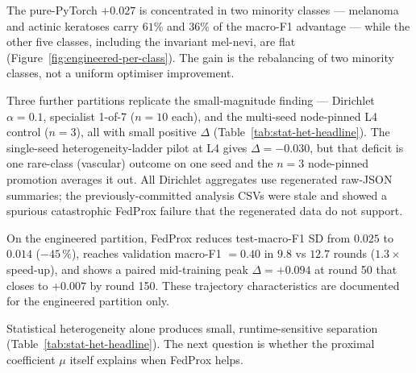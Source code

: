 \documentclass[11pt,a4paper]{report}
\begin{document}
The pure-PyTorch $+0.027$ is concentrated in two minority classes --- melanoma
and actinic keratoses carry $61\%$ and $36\%$ of the macro-F1 advantage --- while
the other five classes, including the invariant mel-nevi, are flat
(Figure~\ref{fig:engineered-per-class}). The gain is the rebalancing of two
minority classes, not a uniform optimiser improvement.

Three further partitions replicate the small-magnitude finding --- Dirichlet
$\alpha = 0.1$, specialist 1-of-7 ($n=10$ each), and the multi-seed node-pinned L4
control ($n=3$), all with small positive $\Delta$
(Table~\ref{tab:stat-het-headline}). The single-seed
heterogeneity-ladder pilot at L4 gives $\Delta = -0.030$, but that deficit is one
rare-class (vascular) outcome on one seed and the $n=3$ node-pinned promotion
averages it out. All Dirichlet aggregates use regenerated raw-JSON summaries; the
previously-committed analysis CSVs were stale and showed a spurious catastrophic
FedProx failure that the regenerated data do not support.

On the engineered partition, FedProx reduces test-macro-F1 SD from $0.025$
to $0.014$ ($-45\,\%$), reaches validation macro-F1 $= 0.40$ in $9.8$ vs
$12.7$ rounds ($1.3\times$ speed-up), and shows a paired mid-training peak
$\Delta = +0.094$ at round 50 that closes to $+0.007$ by round 150. These
trajectory characteristics are documented for the engineered partition only.

Statistical heterogeneity alone produces small, runtime-sensitive separation
(Table~\ref{tab:stat-het-headline}). The
next question is whether the proximal coefficient $\mu$ itself explains when
FedProx helps.


\end{document}
